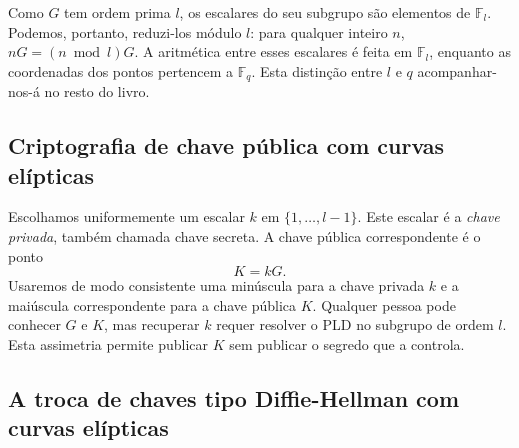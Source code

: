 Como \(G\) tem ordem prima \(l\), os escalares do seu subgrupo são elementos
de \(\mathbb{F}_l\). Podemos, portanto, reduzi-los módulo \(l\): para qualquer
inteiro \(n\), \(nG=(n\bmod l)G\). A aritmética entre esses escalares é feita
em \(\mathbb{F}_l\), enquanto as coordenadas dos pontos pertencem a
\(\mathbb{F}_q\). Esta distinção entre \(l\) e \(q\) acompanhar-nos-á no resto
do livro.





\subsection{Criptografia de chave pública com curvas elípticas}
\label{ec:keys}

Escolhamos uniformemente um escalar \(k\) em \(\{1,\ldots,l-1\}\). Este
escalar é a {\em chave privada}, também chamada chave secreta. A chave pública
correspondente é o ponto
\[
K=kG.
\]
Usaremos de modo consistente uma minúscula para a chave privada \(k\) e a
maiúscula correspondente para a chave pública \(K\).
Qualquer pessoa pode conhecer \(G\) e \(K\), mas recuperar \(k\) requer resolver
o PLD no subgrupo de ordem \(l\). Esta assimetria permite publicar \(K\) sem
publicar o segredo que a controla.



\subsection{A troca de chaves tipo Diffie-Hellman com curvas elípticas}
\label{DH_exchange_section}


